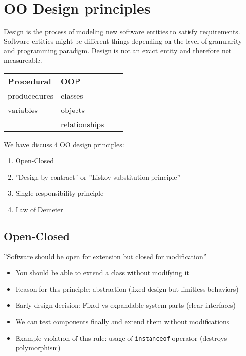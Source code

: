 \documentclass[a4paper]{report}
\begin{document}
\chapter{OO Design principles}

Design is the process of modeling new software entities to satisfy
requirements. Software entities might be different things depending on the
level of granularity and programming paradigm. Design is not an exact
entity and therefore not measureable.

\begin{table}[h]
  \begin{center}
    \begin{tabular}{llll}
    \hline
      Procedural    & OOP \\
    \hline \hline
      producedures  & classes \\
      variables     & objects \\
                    & relationships \\
    \end{tabular}
  \end{center}
\end{table}

We have discuss 4 OO design principles:

\begin{enumerate}
  \item Open-Closed
  \item ''Design by contract'' or ''Liskov substitution principle''
  \item Single responsibility principle
  \item Law of Demeter
\end{enumerate}

\section{Open-Closed}

''Software should be open for extension but closed for modification''

\begin{itemize}
  \item You should be able to extend a class without modifying it
  \item Reason for this principle: abstraction (fixed design but limitless
        behaviors)
  \item Early design decision: Fixed vs expandable system parts
        (clear interfaces)
  \item We can test components finally and extend them without modifications
  \item Example violation of this rule: usage of \texttt{instanceof} operator
        (destroys polymorphism)
\end{itemize}
\end{document}
